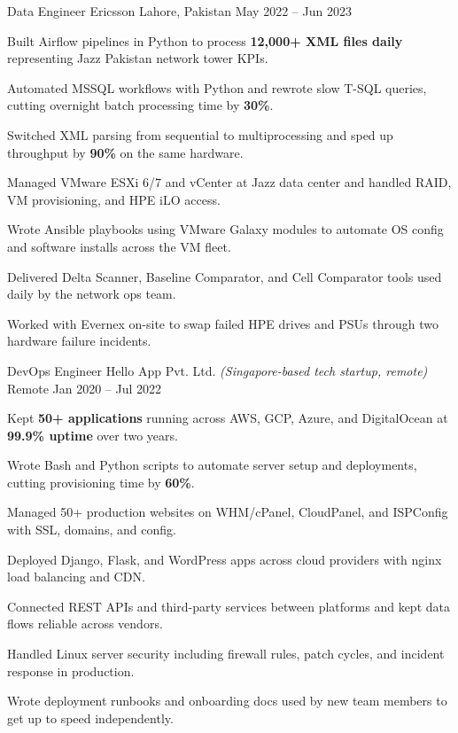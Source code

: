 \documentclass[11pt, a4paper]{awesome-cv}
\begin{document}
\begin{cventries}
  \cventry
    {Data Engineer}
    {Ericsson}
    {Lahore, Pakistan}
    {May 2022 -- Jun 2023}
    {
      \begin{cvitems}
        \item {Built Airflow pipelines in Python to process \textbf{12,000+ XML files daily} representing Jazz Pakistan network tower KPIs.}
        \item {Automated MSSQL workflows with Python and rewrote slow T-SQL queries, cutting overnight batch processing time by \textbf{30\%}.}
        \item {Switched XML parsing from sequential to multiprocessing and sped up throughput by \textbf{90\%} on the same hardware.}
        \item {Managed VMware ESXi 6/7 and vCenter at Jazz data center and handled RAID, VM provisioning, and HPE iLO access.}
        \item {Wrote Ansible playbooks using VMware Galaxy modules to automate OS config and software installs across the VM fleet.}
        \item {Delivered Delta Scanner, Baseline Comparator, and Cell Comparator tools used daily by the network ops team.}
        \item {Worked with Evernex on-site to swap failed HPE drives and PSUs through two hardware failure incidents.}
      \end{cvitems}
    }

  \cventry
    {DevOps Engineer}
    {Hello App Pvt. Ltd. \small\normalfont\textit{(Singapore-based tech startup, remote)}}
    {Remote}
    {Jan 2020 -- Jul 2022}
    {
      \begin{cvitems}
        \item {Kept \textbf{50+ applications} running across AWS, GCP, Azure, and DigitalOcean at \textbf{99.9\% uptime} over two years.}
        \item {Wrote Bash and Python scripts to automate server setup and deployments, cutting provisioning time by \textbf{60\%}.}
        \item {Managed 50+ production websites on WHM/cPanel, CloudPanel, and ISPConfig with SSL, domains, and config.}
        \item {Deployed Django, Flask, and WordPress apps across cloud providers with nginx load balancing and CDN.}
        \item {Connected REST APIs and third-party services between platforms and kept data flows reliable across vendors.}
        \item {Handled Linux server security including firewall rules, patch cycles, and incident response in production.}
        \item {Wrote deployment runbooks and onboarding docs used by new team members to get up to speed independently.}
      \end{cvitems}
    }


\end{cventries}
\end{document}
